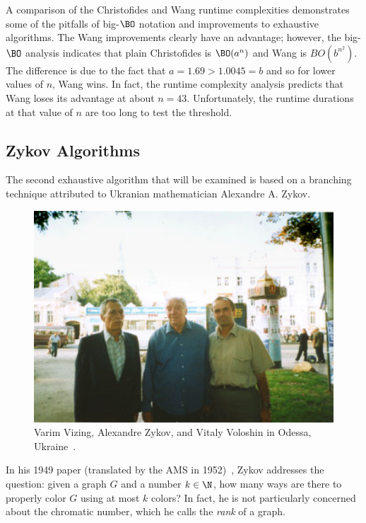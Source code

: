 A comparison of the Christofides and Wang runtime complexities demonstrates some of the pitfalls of big-\(\BO\)
notation and improvements to exhaustive algorithms.  The Wang improvements clearly have an advantage; however, the
big-\(\BO\) analysis indicates that plain Christofides is \(\BO(a^n)\) and Wang is \(BO(b^{n^2})\).  The difference
is due to the fact that \(a=1.69>1.0045=b\) and so for lower values of \(n\), Wang wins.  In fact, the runtime
complexity analysis predicts that Wang loses its advantage at about \(n=43\).  Unfortunately, the runtime durations
at that value of \(n\) are too long to test the threshold.

\subsection{Zykov Algorithms}\label{sec:sub:zykov}

The second exhaustive algorithm that will be examined is based on a branching technique attributed to Ukranian
mathematician Alexandre A. Zykov.

\begin{figure}[H]
  \centering
  \includegraphics[width=5in]{zykov}
  \caption{Varim Vizing, Alexandre Zykov, and Vitaly Voloshin in Odessa, Ukraine~\cite{voloshin}.}
  \label{fig:pic:zykov}
\end{figure}

In his 1949 paper (translated by the AMS in 1952)~\cite{zykov}, Zykov addresses
the question: given a graph \(G\) and a number \(k\in\N\), how many ways are there to properly color \(G\) using at
most \(k\) colors?  In fact, he is not particularly concerned about the chromatic number, which he calls the
\emph{rank} of a graph.

